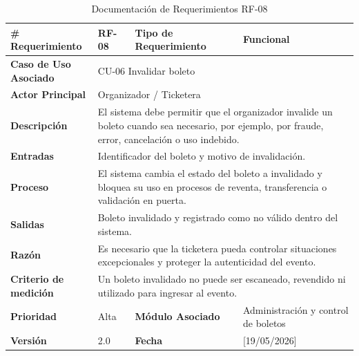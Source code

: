 \documentclass[12pt,letterpaper]{article}
\begin{document}
\begin{table}[H]
\centering
\scriptsize
\renewcommand{\arraystretch}{1.05}
\setlength{\tabcolsep}{3pt}

\newlength{\anchoceldaRFocho}
\setlength{\anchoceldaRFocho}{\dimexpr\textwidth-2.7cm-8\tabcolsep-5\arrayrulewidth\relax}

\begin{tabularx}{\textwidth}{|p{2.7cm}|X|p{2.8cm}|X|}
\hline
\textbf{\# Requerimiento} & RF-08 & \textbf{Tipo de Requerimiento} & Funcional \\ \hline

\textbf{Caso de Uso Asociado} & 
\multicolumn{3}{p{\anchoceldaRFocho}|}{CU-06 Invalidar boleto} \\ \hline

\textbf{Actor Principal} & 
\multicolumn{3}{p{\anchoceldaRFocho}|}{Organizador / Ticketera} \\ \hline

\textbf{Descripción} & 
\multicolumn{3}{p{\anchoceldaRFocho}|}{El sistema debe permitir que el organizador invalide un boleto cuando sea necesario, por ejemplo, por fraude, error, cancelación o uso indebido.} \\ \hline

\textbf{Entradas} & 
\multicolumn{3}{p{\anchoceldaRFocho}|}{Identificador del boleto y motivo de invalidación.} \\ \hline

\textbf{Proceso} & 
\multicolumn{3}{p{\anchoceldaRFocho}|}{El sistema cambia el estado del boleto a invalidado y bloquea su uso en procesos de reventa, transferencia o validación en puerta.} \\ \hline

\textbf{Salidas} & 
\multicolumn{3}{p{\anchoceldaRFocho}|}{Boleto invalidado y registrado como no válido dentro del sistema.} \\ \hline

\textbf{Razón} & 
\multicolumn{3}{p{\anchoceldaRFocho}|}{Es necesario que la ticketera pueda controlar situaciones excepcionales y proteger la autenticidad del evento.} \\ \hline

\textbf{Criterio de medición} & 
\multicolumn{3}{p{\anchoceldaRFocho}|}{Un boleto invalidado no puede ser escaneado, revendido ni utilizado para ingresar al evento.} \\ \hline

\textbf{Prioridad} & Alta & \textbf{Módulo Asociado} & Administración y control de boletos \\ \hline

\textbf{Versión} & 2.0 & \textbf{Fecha} & [19/05/2026] \\ \hline

\end{tabularx}

\caption{Documentación de Requerimientos RF-08}
\label{tab:documentacion_requerimientos_rf08}
\normalsize
\end{table}
\end{document}
